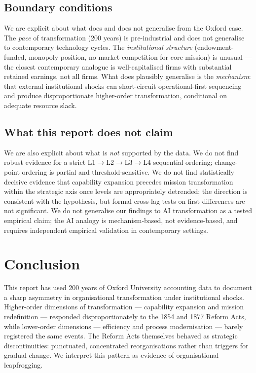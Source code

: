 \documentclass[11pt]{article}
\begin{document}
\subsection{Boundary conditions}

We are explicit about what does and does not generalise from the Oxford case. The \emph{pace} of transformation (200 years) is pre-industrial and does not generalise to contemporary technology cycles. The \emph{institutional structure} (endowment-funded, monopoly position, no market competition for core mission) is unusual --- the closest contemporary analogue is well-capitalised firms with substantial retained earnings, not all firms. What does plausibly generalise is the \emph{mechanism}: that external institutional shocks can short-circuit operational-first sequencing and produce disproportionate higher-order transformation, conditional on adequate resource slack.

\subsection{What this report does not claim}

We are also explicit about what is \emph{not} supported by the data. We do not find robust evidence for a strict L1$\rightarrow$L2$\rightarrow$L3$\rightarrow$L4 sequential ordering; change-point ordering is partial and threshold-sensitive. We do not find statistically decisive evidence that capability expansion precedes mission transformation within the strategic axis once levels are appropriately detrended; the direction is consistent with the hypothesis, but formal cross-lag tests on first differences are not significant. We do not generalise our findings to AI transformation as a tested empirical claim; the AI analogy is mechanism-based, not evidence-based, and requires independent empirical validation in contemporary settings.

\section{Conclusion}
\label{sec:conclusion}

This report has used 200 years of Oxford University accounting data to document a sharp asymmetry in organisational transformation under institutional shocks. Higher-order dimensions of transformation --- capability expansion and mission redefinition --- responded disproportionately to the 1854 and 1877 Reform Acts, while lower-order dimensions --- efficiency and process modernisation --- barely registered the same events. The Reform Acts themselves behaved as strategic discontinuities: punctuated, concentrated reorganisations rather than triggers for gradual change. We interpret this pattern as evidence of organisational leapfrogging.
\end{document}
